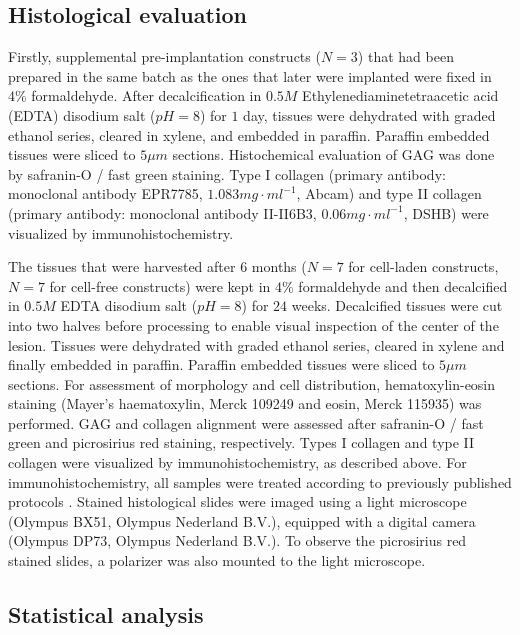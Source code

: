 \documentclass[twocolumn, serif, empirical, authordate, seplic]{jote-article}
\begin{document}
 {}\subsection*{Histological evaluation} 

Firstly, supplemental pre-implantation constructs ($N=3$) that had been prepared in the same batch as the ones that later were implanted were fixed in $4\%$ formaldehyde. After decalcification in $0.5M$ Ethylenediaminetetraacetic acid (EDTA) disodium salt ($pH = 8$) for $1$ day, tissues were dehydrated with graded ethanol series, cleared in xylene, and embedded in paraffin. Paraffin embedded tissues were sliced to $5 \mu m$ sections. Histochemical evaluation of GAG was done by safranin-O / fast green staining. Type I collagen (primary antibody: monoclonal antibody EPR7785, $1.083 mg\cdot ml^{-1}$, Abcam) and type II collagen (primary antibody: monoclonal antibody II-II6B3, $0.06 mg\cdot ml^{-1}$, DSHB) were visualized by immunohistochemistry.

The tissues that were harvested after $6$ months ($N=7$ for cell-laden constructs, $N=7$ for cell-free constructs) were kept in $4\%$ formaldehyde and then decalcified in $0.5M$ EDTA disodium salt ($pH = 8$) for $24$ weeks. Decalcified tissues were cut into two halves before processing to enable visual inspection of the center of the lesion. Tissues were dehydrated with graded ethanol series, cleared in xylene and finally embedded in paraffin. Paraffin embedded tissues were sliced to $5 \mu m$ sections. For assessment of morphology and cell distribution, hematoxylin-eosin staining (Mayer's haematoxylin, Merck 109249 and eosin, Merck 115935) was performed. GAG and collagen alignment were assessed after safranin-O / fast green and picrosirius red staining, respectively. Types I collagen and type II collagen were visualized by immunohistochemistry, as described above. For immunohistochemistry, all samples were treated according to previously published protocols \parencite{Levato2017}. Stained histological slides were imaged using a light microscope (Olympus BX51, Olympus Nederland B.V.), equipped with a digital camera (Olympus DP73, Olympus Nederland B.V.). To observe the picrosirius red stained slides, a polarizer was also mounted to the light microscope.

 {}\subsection*{Statistical analysis} 
\end{document}
